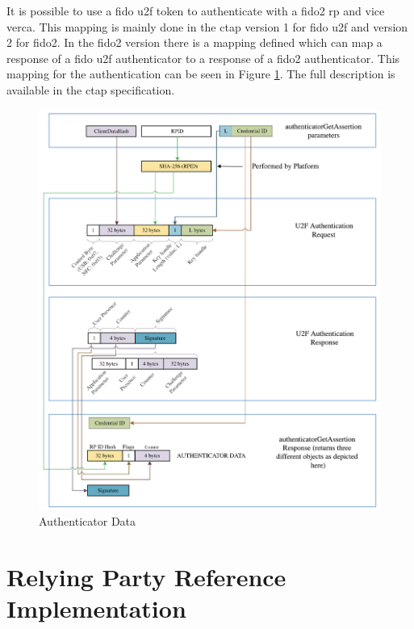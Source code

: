 \documentclass[a4paper, 11pt]{scrartcl}
\begin{document}
It is possible to use a \gls{fido} \gls{u2f} token to authenticate with a \gls{fido2} \gls{rp} and vice verca. This mapping is mainly done in the \gls{ctap} version 1 for \gls{fido} \gls{u2f} and version 2 for \gls{fido2}. In the \gls{fido2} version there is a mapping defined which can map a response of a \gls{fido} \gls{u2f} authenticator to a response of a \gls{fido2} authenticator. This mapping for the authentication can be seen in Figure \ref{fig:authenticationMapping}. The full description is available in the \gls{ctap} specification\cite{yubico:whatIsFido2, ctap:interoperability}.

\begin{figure}[ht]
  \includegraphics[width=16cm]{img/u2fcompat-getassertion.png}
  \centering
  \caption{Authenticator Data}
  \label{fig:authenticationMapping}
\end{figure}


\section{Relying Party Reference Implementation}
\label{sec:replying_party}
\end{document}
